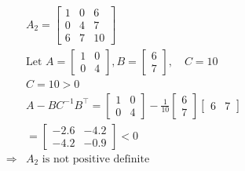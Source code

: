 \documentclass{article}
\theoremstyle{definition} %
\begin{document}
\subsection{}
\begin{align*}
	&A_2=\left[\begin{array}{lll}
	1 & 0 & 6 \\
	0 & 4 & 7 \\
	6 & 7 & 10
	\end{array}\right]\\
	&\text {Let } A=\left[\begin{array}{ll}
	1 & 0 \\
	0 & 4
	\end{array}\right], B=\left[\begin{array}{l}
	6 \\
	7
	\end{array}\right], \quad C=10\\
	&C=10>0\\
	&A-B C^{-1} B^{\top}=
	\left[\begin{array}{ll}
	1 & 0 \\
	0 & 4
	\end{array}\right]
	-
	\frac{1}{10}\left[\begin{array}{l}
	6 \\
	7
	\end{array}\right]\left[\begin{array}{ll}
	6 & 7
	\end{array}\right]\\
	&=\left[\begin{array}{ll}
	-2.6 & -4.2 \\
	-4.2 & -0.9
	\end{array}\right]
	<0\\
	\Rightarrow &{A}_2 \text { is not positive definite }
\end{align*}
\end{document}
